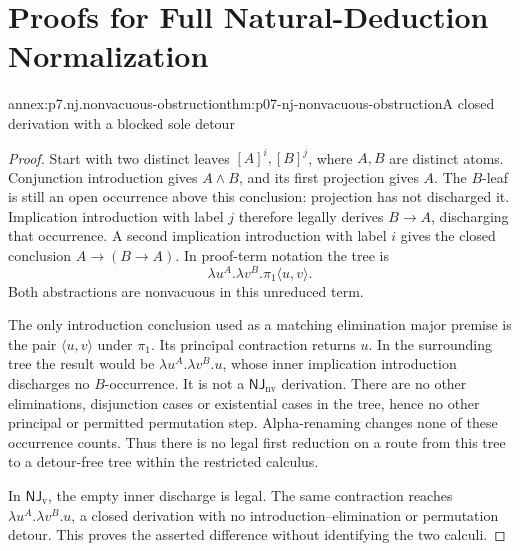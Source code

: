 \chapter{Proofs for Full Natural-Deduction Normalization}
\label{annex:p07-natural-deduction-normalization}

\begin{annexitem}{annex:p7.nj.nonvacuous-obstruction}{thm:p07-nj-nonvacuous-obstruction}{A closed derivation with a blocked sole detour}
\begin{proof}
Start with two distinct leaves \([A]^i,[B]^j\), where
\(A,B\) are distinct atoms. Conjunction introduction gives
\(A\land B\), and its first projection gives \(A\).
The \(B\)-leaf is still an open occurrence above this conclusion:
projection has not discharged it. Implication introduction with
label \(j\) therefore legally derives \(B\to A\), discharging
that occurrence. A second implication introduction with label
\(i\) gives the closed conclusion \(A\to(B\to A)\).
In proof-term notation the tree is
\[
       \lambda u^A.\lambda v^B.\pi_1\langle u,v\rangle.
\]
Both abstractions are nonvacuous in this unreduced term.

The only introduction conclusion used as a matching elimination
major premise is the pair \(\langle u,v\rangle\) under
\(\pi_1\). Its principal contraction returns \(u\).
In the surrounding tree the result would be
\(\lambda u^A.\lambda v^B.u\), whose inner implication
introduction discharges no \(B\)-occurrence. It is not a
\(\mathsf{NJ}_{\mathrm{nv}}\) derivation. There are no other
eliminations, disjunction cases or existential cases in the
tree, hence no other principal or permitted permutation step.
Alpha-renaming changes none of these occurrence counts.
Thus there is no legal first reduction on a route from this
tree to a detour-free tree within the restricted calculus.

In \(\mathsf{NJ}_{\mathrm v}\), the empty inner discharge
is legal. The same contraction reaches
\(\lambda u^A.\lambda v^B.u\), a closed derivation with no
introduction--elimination or permutation detour. This proves
the asserted difference without identifying the two calculi.
\end{proof}
\end{annexitem}

